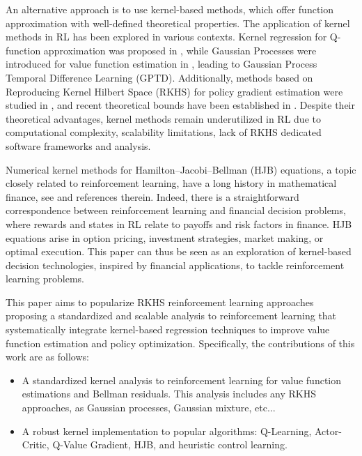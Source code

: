 \documentclass[
]{article}
\numberwithin{equation}{section}
\begin{document}
An alternative approach is to use kernel-based methods, which offer function approximation with well-defined theoretical properties.  The application of kernel methods in RL has been explored in various contexts. Kernel regression for Q-function approximation was proposed in \cite{ormoneit2002}, while Gaussian Processes were introduced for value function estimation in \cite{engel2003}, leading to Gaussian Process Temporal Difference Learning (GPTD). Additionally, methods based on Reproducing Kernel Hilbert Space (RKHS) for policy gradient estimation were studied in \cite{Xu2007}, and recent theoretical bounds have been established in \cite{SF2023}. Despite their theoretical advantages, kernel methods remain underutilized in RL due to computational complexity, scalability limitations, lack of RKHS dedicated software frameworks and analysis. 

Numerical kernel methods for Hamilton–Jacobi–Bellman (HJB) equations, a topic closely related to reinforcement learning, have a long history in mathematical finance, see \cite{PLF-JMM-Wilmott} and references therein. Indeed, there is a straightforward correspondence between reinforcement learning and financial decision problems, where rewards and states in RL relate to payoffs and risk factors in finance. HJB equations arise in option pricing, investment strategies, market making, or optimal execution. This paper can thus be seen as an exploration of kernel-based decision technologies, inspired by financial applications, to tackle reinforcement learning problems.

This paper aims to popularize RKHS reinforcement learning approaches proposing a standardized and scalable analysis to reinforcement learning that systematically integrate kernel-based regression techniques to improve value function estimation and policy optimization. Specifically, the contributions of this work are as follows:

\begin{itemize}
\item A standardized kernel analysis to reinforcement learning for value function estimations and Bellman residuals. This analysis includes any RKHS approaches, as Gaussian processes, Gaussian mixture, etc...

\item A robust kernel implementation to popular algorithms: Q-Learning, Actor-Critic, Q-Value Gradient, HJB, and heuristic control learning.

\end{itemize}
\end{document}
